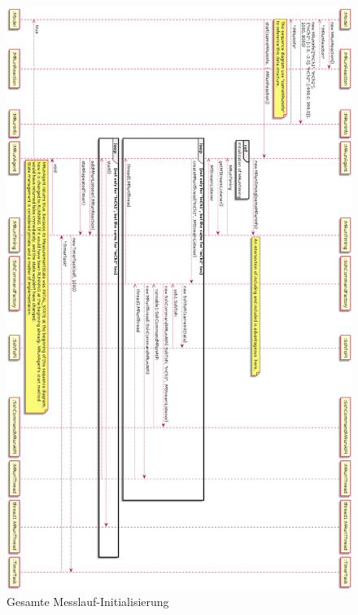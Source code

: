 \documentclass[parskip=full]{scrartcl}
\begin{document}
\begin{figure}[htbp]
	\begin{center}
		\includegraphics[width = 14cm]{Grafiken/3-MRunGesamteVorbereitung_Rotated.png}
		\caption{Gesamte Messlauf-Initialisierung}
		\label{MRunInitComplete}
	\end{center}
\end{figure}
\end{document}
